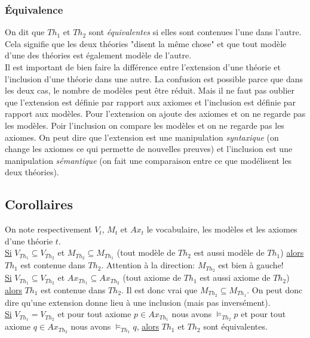 {\subsubsection{Équivalence}
On dit que $Th_1$ et $Th_2$ sont {\em équivalentes} si elles sont contenues l'une dans l'autre.
Cela signifie que les deux théories "disent la même chose" et que tout modèle d'une des théories est également modèle de l'autre.\\


Il est important de bien faire la différence entre
l'extension d'une théorie et l'inclusion d'une théorie dans une autre.
La confusion est possible parce que dans les deux cas, le nombre de modèles peut être réduit.
Mais il ne faut pas oublier que
l'extension est définie par rapport aux axiomes et l'inclusion est définie par rapport aux modèles.
Pour l'extension on ajoute des axiomes et on ne regarde pas les modèles.
Poir l'inclusion on compare les modèles et on ne regarde pas les axiomes.
On peut dire que l'extension est une manipulation {\em syntaxique} (on change les axiomes ce qui permette de nouvelles preuves)
et l'inclusion est une manipulation {\em sémantique} (on fait une comparaison entre ce que modélisent les deux théories).

\subsection{Corollaires}
On note respectivement $V_t$, $M_t$ et $Ax_t$ le vocabulaire, les modèles et les axiomes d'une théorie $t$. \\

\noindent \underline{Si} $V_{Th_1} \subseteq V_{Th_2}$ et $M_{Th_2} \subseteq M_{Th_1}$
(tout modèle de $Th_2$ est aussi modèle de $Th_1$) \underline{alors} $Th_1$ est contenue dans $Th_2$.
Attention à la direction: $M_{Th_2}$ est bien à gauche!
\\

\noindent \underline{Si} $V_{Th_1} \subseteq V_{Th_2}$ et $Ax_{Th_1} \subseteq Ax_{Th_2}$
(tout axiome de $Th_1$ est aussi axiome de $Th_2$) \underline{alors} $Th_1$ est contenue dans $Th_2$.
Il est donc vrai que $M_{Th_2} \subseteq M_{Th_1}$.
On peut donc dire qu'une extension donne lieu à une inclusion (mais pas inversément).\\

\noindent \underline{Si} $V_{Th_1} = V_{Th_2}$ 
et pour tout axiome $p \in Ax_{Th_1}$ nous avons $\models_{Th_2} p$
et pour tout axiome $q \in Ax_{Th_2}$ nous avons $\models_{Th_1} q$,
\underline{alors}
$Th_1$ et $Th_2$ sont équivalentes. \\

}
